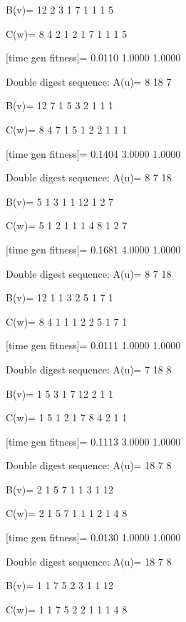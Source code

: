 B(v)=
    12     2     3     1     7     1     1     1     5

C(w)=
     8     4     2     1     2     1     7     1     1     1     5

[time gen fitness]=
    0.0110    1.0000    1.0000

Double digest sequence:
A(u)=
     8    18     7

B(v)=
    12     7     1     5     3     2     1     1     1

C(w)=
     8     4     7     1     5     1     2     2     1     1     1

[time gen fitness]=
    0.1404    3.0000    1.0000

Double digest sequence:
A(u)=
     8     7    18

B(v)=
     5     1     3     1     1    12     1     2     7

C(w)=
     5     1     2     1     1     1     4     8     1     2     7

[time gen fitness]=
    0.1681    4.0000    1.0000

Double digest sequence:
A(u)=
     8     7    18

B(v)=
    12     1     1     3     2     5     1     7     1

C(w)=
     8     4     1     1     1     2     2     5     1     7     1

[time gen fitness]=
    0.0111    1.0000    1.0000

Double digest sequence:
A(u)=
     7    18     8

B(v)=
     1     5     3     1     7    12     2     1     1

C(w)=
     1     5     1     2     1     7     8     4     2     1     1

[time gen fitness]=
    0.1113    3.0000    1.0000

Double digest sequence:
A(u)=
    18     7     8

B(v)=
     2     1     5     7     1     1     3     1    12

C(w)=
     2     1     5     7     1     1     1     2     1     4     8

[time gen fitness]=
    0.0130    1.0000    1.0000

Double digest sequence:
A(u)=
    18     7     8

B(v)=
     1     1     7     5     2     3     1     1    12

C(w)=
     1     1     7     5     2     2     1     1     1     4     8

